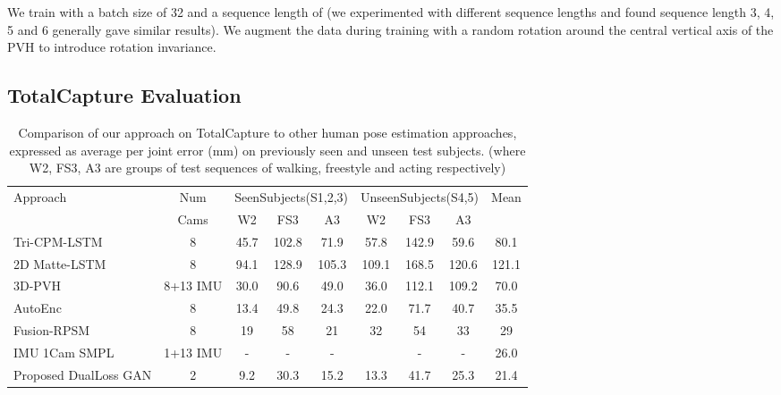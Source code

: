 \documentclass{bmvc2k}
\newcommand{\squeezeup}{\vspace{-2mm}}
\begin{document}
We train with a batch size of 32 and a sequence length of  (we experimented with different sequence lengths and found sequence length 3, 4, 5 and 6 generally gave similar results). We augment the data during training with a random rotation around the central vertical axis of the PVH to introduce rotation invariance. 
\squeezeup
\squeezeup

\subsection{TotalCapture Evaluation}
\begin{table*}[htb]
\centering
{
\small
\begin{tabular}{lcccccccc}
\hline
Approach &                              Num    &\multicolumn{3}{c}{SeenSubjects(S1,2,3)}&\multicolumn{3}{c}{UnseenSubjects(S4,5)} & Mean \\
                                         &Cams& W2 & FS3 & A3 & W2 & FS3 & A3 & \\ \hline
Tri-CPM-LSTM~\cite{cao2016realtimeCPM}   & 8  & 45.7 &102.8 & 71.9& 57.8 & 142.9 & 59.6 & 80.1 \\ 
2D Matte-LSTM~\cite{TrumbleCVMP2DConvNet}& 8  & 94.1 &128.9  &105.3 & 109.1& 168.5&120.6&121.1 \\ 
3D-PVH~\cite{trumble_total_2017}         & 8+13 IMU& 30.0 & 90.6 & 49.0 & 36.0 & 112.1 & 109.2 & 70.0 \\ 
AutoEnc~\cite{trumble:eccv:2018}         & 8 & 13.4 & 49.8 & 24.3 & 22.0 & 71.7 & 40.7 & 35.5 \\ 
Fusion-RPSM~\cite{Qiu:iccv:2019}         & 8 & 19   &58    &21    &32    &54    &33   & 29 \\
IMU 1Cam SMPL~\cite{PonsECCV18}          &1+13 IMU& -    &   -  &  -   &      &  -   &   -  & 26.0 \\ \hline
Proposed DualLoss GAN                    & 2 & 9.2 & 30.3 & 15.2 & 13.3 & 41.7 & 25.3 & 21.4 \\ \hline
\end{tabular}
}
\caption{Comparison of our approach on  TotalCapture  to other human pose estimation approaches, expressed as average per joint error (mm) on previously seen and unseen test subjects. (where W2, FS3, A3 are groups of test sequences of walking, freestyle and acting respectively)}
\label{tab:totalcaptureResults}
\squeezeup
\end{table*}
\label{sec:TCEval}
\end{document}
